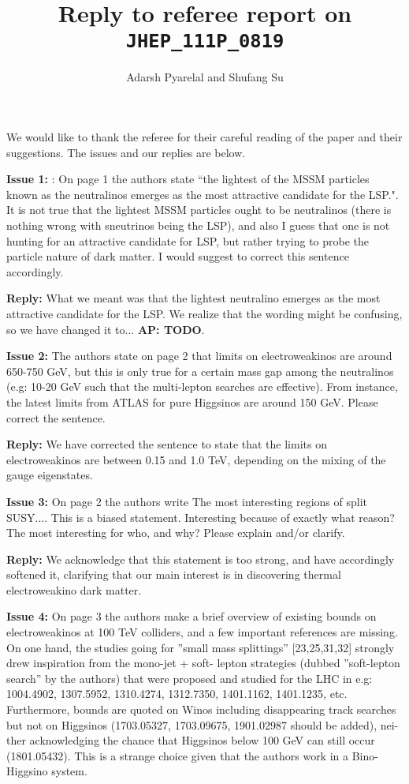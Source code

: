 \documentclass[12pt]{article}
\title{Reply to referee report on \texttt{JHEP\_111P\_0819}}
\author{Adarsh Pyarelal and Shufang Su}
\newcommand{\Adarsh}[1]{{\bf\color{RoyalBlue} AP: #1}}
\newcommand{\issue}[1]{\bigskip\noindent\textbf{\color{Maroon}Issue #1: }}
\newcommand{\reply}{\medskip\noindent\textbf{\color{RoyalBlue}Reply:}}
\begin{document}
\maketitle

We would like to thank the referee for their careful reading of the paper and their 
suggestions. The issues and our replies are below.

 \issue{1}: On page 1 the authors state ``the lightest of the
MSSM particles known as the neutralinos emerges as the most attractive
candidate for the LSP.". It is not true that the lightest MSSM particles ought
to be neutralinos (there is nothing wrong with sneutrinos being the LSP), and
also I guess that one is not hunting for an attractive candidate for LSP, but
rather trying to probe the particle nature of dark matter. I would suggest to
correct this sentence accordingly.

\reply{} What we meant was that the lightest neutralino
emerges as the most attractive candidate for the LSP. We realize that the
wording might be confusing, so we have changed it to...\Adarsh{TODO}.

 \issue{2} The authors state on page 2 that limits on
electroweakinos are around 650-750 GeV, but this is only true for a certain
mass gap among the neutralinos (e.g: 10-20 GeV such that the multi-lepton
searches are effective). From instance, the latest limits from ATLAS for pure
Higgsinos are around 150 GeV. Please correct the sentence.

\reply{} We have corrected the sentence to state that the
limits on electroweakinos are between 0.15 and 1.0 TeV, depending on the mixing
of the gauge eigenstates.

\issue{3} On page 2 the authors write The most interesting
regions of split SUSY....  This is a biased statement. Interesting because of
exactly what reason? The most interesting for who, and why? Please explain
and/or clarify.

\reply{} We acknowledge that this statement is too
strong, and have accordingly softened it, clarifying that our main interest is
in discovering thermal electroweakino dark matter.

\issue{4} On page 3 the authors make a brief overview of existing bounds on
electroweakinos at 100 TeV colliders, and a few important references are
missing. On one hand, the studies going for ”small mass splittings”
[23,25,31,32] strongly drew inspiration from the mono-jet + soft- lepton
strategies (dubbed ”soft-lepton search” by the authors) that were proposed and
studied for the LHC in e.g: 1004.4902, 1307.5952, 1310.4274, 1312.7350,
1401.1162, 1401.1235, etc. Furthermore, bounds are quoted on Winos including
disappearing track searches but not on Higgsinos (1703.05327, 1703.09675,
1901.02987 should be added), nei- ther acknowledging the chance that Higgsinos
below 100 GeV can still occur (1801.05432). This is a strange choice given that
the authors work in a Bino-Higgsino system.
\end{document}
